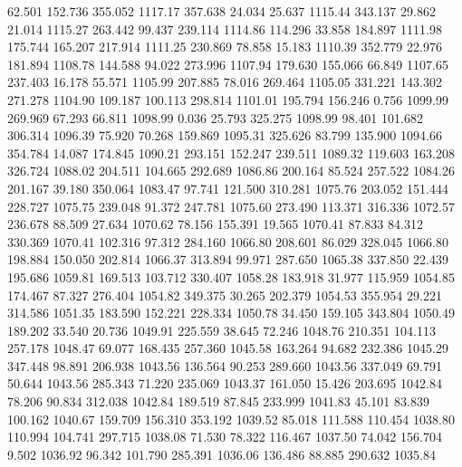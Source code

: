   62.501  152.736  355.052      1117.17
 357.638   24.034   25.637      1115.44
 343.137   29.862   21.014      1115.27
 263.442   99.437  239.114      1114.86
 114.296   33.858  184.897      1111.98
 175.744  165.207  217.914      1111.25
 230.869   78.858   15.183      1110.39
 352.779   22.976  181.894      1108.78
 144.588   94.022  273.996      1107.94
 179.630  155.066   66.849      1107.65
 237.403   16.178   55.571      1105.99
 207.885   78.016  269.464      1105.05
 331.221  143.302  271.278      1104.90
 109.187  100.113  298.814      1101.01
 195.794  156.246    0.756      1099.99
 269.969   67.293   66.811      1098.99
   0.036   25.793  325.275      1098.99
  98.401  101.682  306.314      1096.39
  75.920   70.268  159.869      1095.31
 325.626   83.799  135.900      1094.66
 354.784   14.087  174.845      1090.21
 293.151  152.247  239.511      1089.32
 119.603  163.208  326.724      1088.02
 204.511  104.665  292.689      1086.86
 200.164   85.524  257.522      1084.26
 201.167   39.180  350.064      1083.47
  97.741  121.500  310.281      1075.76
 203.052  151.444  228.727      1075.75
 239.048   91.372  247.781      1075.60
 273.490  113.371  316.336      1072.57
 236.678   88.509   27.634      1070.62
  78.156  155.391   19.565      1070.41
  87.833   84.312  330.369      1070.41
 102.316   97.312  284.160      1066.80
 208.601   86.029  328.045      1066.80
 198.884  150.050  202.814      1066.37
 313.894   99.971  287.650      1065.38
 337.850   22.439  195.686      1059.81
 169.513  103.712  330.407      1058.28
 183.918   31.977  115.959      1054.85
 174.467   87.327  276.404      1054.82
 349.375   30.265  202.379      1054.53
 355.954   29.221  314.586      1051.35
 183.590  152.221  228.334      1050.78
  34.450  159.105  343.804      1050.49
 189.202   33.540   20.736      1049.91
 225.559   38.645   72.246      1048.76
 210.351  104.113  257.178      1048.47
  69.077  168.435  257.360      1045.58
 163.264   94.682  232.386      1045.29
 347.448   98.891  206.938      1043.56
 136.564   90.253  289.660      1043.56
 337.049   69.791   50.644      1043.56
 285.343   71.220  235.069      1043.37
 161.050   15.426  203.695      1042.84
  78.206   90.834  312.038      1042.84
 189.519   87.845  233.999      1041.83
  45.101   83.839  100.162      1040.67
 159.709  156.310  353.192      1039.52
  85.018  111.588  110.454      1038.80
 110.994  104.741  297.715      1038.08
  71.530   78.322  116.467      1037.50
  74.042  156.704    9.502      1036.92
  96.342  101.790  285.391      1036.06
 136.486   88.885  290.632      1035.84
